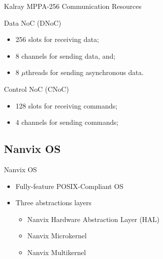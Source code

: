 		\begin{frame}[fragile]{Kalray MPPA-256 Communication Resources}
			\item {Data NoC (DNoC)}
			\begin{itemize}
				\item 256 slots for receiving data;
				\item 8 channels for sending data, and;
				\item 8 $\mu$threads for sending asynchronous data.
			\end{itemize}

			\item {Control NoC (CNoC)}
			\begin{itemize}
				\item 128 slots for receiving commands;
				\item 4 channels for sending commands;
			\end{itemize}

		\end{frame}

	\subsection{Nanvix OS}

		\begin{frame}[fragile]{Nanvix OS}
			\begin{itemize}
				\item Fully-feature POSIX-Compliant OS
				\item Three abstractions layers
				\begin{itemize}
					\item Nanvix Hardware Abstraction Layer (HAL)
					\item Nanvix Microkernel
					\item Nanvix Multikernel
				\end{itemize}
			\end{itemize}

		\end{frame}

